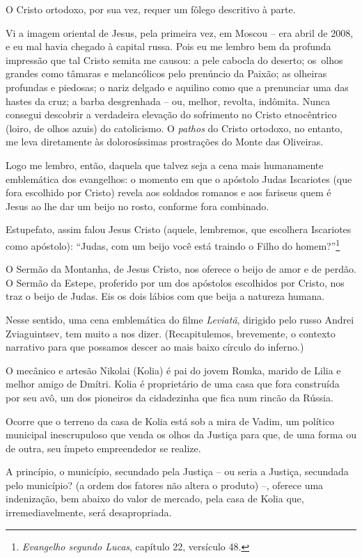 O Cristo ortodoxo, por sua vez, requer um fôlego descritivo à parte.

Vi a imagem oriental de Jesus, pela primeira vez, em Moscou -- era abril
de 2008, e eu mal havia chegado à capital russa. Pois eu me lembro bem
da profunda impressão que tal Cristo semita me causou: a pele cabocla do
deserto; os~olhos grandes como tâmaras e melancólicos pelo prenúncio da
Paixão; as olheiras profundas e piedosas; o nariz delgado e aquilino
como que a prenunciar uma das hastes da cruz; a barba desgrenhada -- ou,
melhor, revolta, indômita. Nunca consegui descobrir a verdadeira
elevação do sofrimento no Cristo etnocêntrico (loiro, de olhos azuis) do
catolicismo. O \emph{pathos} do Cristo ortodoxo, no entanto, me leva
diretamente às dolorosíssimas prostrações do Monte das Oliveiras.

Logo me lembro, então, daquela que talvez seja a cena mais humanamente
emblemática dos evangelhos: o momento em que o apóstolo Judas Iscariotes
(que fora escolhido por Cristo) revela aos soldados romanos e aos
fariseus quem é Jesus ao lhe dar um beijo no rosto, conforme fora
combinado.

Estupefato, assim falou Jesus Cristo (aquele, lembremos, que escolhera
Iscariotes como apóstolo): ``Judas, com um beijo você está traindo o
Filho do homem?''\footnote{\emph{Evangelho segundo Lucas}, capítulo 22,
  versículo 48.}

O Sermão da Montanha, de Jesus Cristo, nos oferece o beijo de amor e de
perdão. O Sermão da Estepe, proferido por um dos apóstolos escolhidos
por Cristo, nos traz o beijo de Judas. Eis os dois lábios com que beija
a natureza humana.

Nesse sentido, uma cena emblemática do filme \emph{Leviatã}, dirigido
pelo russo Andrei Zviaguintsev, tem muito a nos dizer. (Recapitulemos,
brevemente, o contexto narrativo para que possamos descer ao mais baixo
círculo do inferno.)

O mecânico e artesão Nikolai (Kolia) é pai do jovem Romka, marido de
Lilia e melhor amigo de Dmítri. Kolia é proprietário de uma casa que
fora construída por seu avô, um dos pioneiros da cidadezinha que fica
num rincão da Rússia.

Ocorre que o terreno da casa de Kolia está sob a mira de Vadim, um
político municipal inescrupuloso que venda os olhos da Justiça para que,
de uma forma ou de outra, seu ímpeto empreendedor se realize.

A princípio, o município, secundado pela Justiça -- ou seria a Justiça,
secundada pelo município? (a ordem dos fatores não altera o produto) --,
oferece uma indenização, bem abaixo do valor de mercado, pela casa de
Kolia que, irremediavelmente, será desapropriada.

